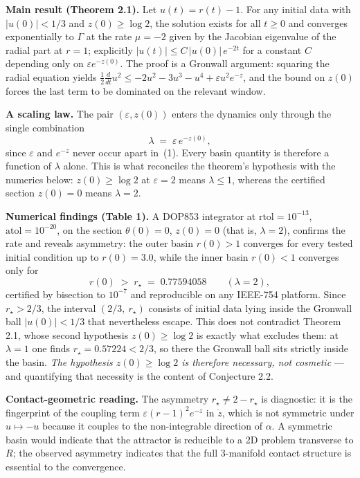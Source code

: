 \documentclass[11pt,a4paper]{article}
\theoremstyle{plain}
\newcommand{\rstar}{r_{\star}}
\begin{document}
\medskip
\noindent\textbf{Main result (Theorem 2.1).} Let $u(t) = r(t)-1$. For any initial data with
$|u(0)| < 1/3$ and $z(0) \ge \log 2$, the solution exists for all $t \ge 0$ and converges
exponentially to $\Gamma$ at the rate $\mu = -2$ given by the Jacobian eigenvalue of the radial part
at $r=1$; explicitly $|u(t)| \le C\,|u(0)|\,e^{-2t}$ for a constant $C$ depending only on
$\varepsilon e^{-z(0)}$. The proof is a Gronwall argument: squaring the radial equation yields
$\tfrac12 \tfrac{d}{dt}u^2 \le -2u^2 - 3u^3 - u^4 + \varepsilon u^2 e^{-z}$, and the bound on $z(0)$
forces the last term to be dominated on the relevant window.

\medskip
\noindent\textbf{A scaling law.} The pair $(\varepsilon, z(0))$ enters the dynamics only through the
single combination
\begin{equation}
  \lambda \;=\; \varepsilon\, e^{-z(0)},
\end{equation}
since $\varepsilon$ and $e^{-z}$ never occur apart in~(1). Every basin quantity is therefore a
function of $\lambda$ alone. This is what reconciles the theorem's hypothesis with the numerics
below: $z(0) \ge \log 2$ at $\varepsilon = 2$ means $\lambda \le 1$, whereas the certified section
$z(0)=0$ means $\lambda = 2$.

\medskip
\noindent\textbf{Numerical findings (Table 1).} A DOP853 integrator at
$\mathrm{rtol} = 10^{-13}$, $\mathrm{atol} = 10^{-20}$, on the section
$\theta(0)=0$, $z(0)=0$ (that is, $\lambda = 2$), confirms the rate and reveals
asymmetry: the outer basin $r(0)>1$ converges for every tested initial condition up to
$r(0) = 3.0$, while the inner basin $r(0)<1$ converges only for
\begin{equation}
  r(0) \;>\; \rstar \;=\; 0.77594058 \qquad (\lambda = 2),
\end{equation}
certified by bisection to $10^{-7}$ and reproducible on any IEEE-754 platform. Since
$\rstar > 2/3$, the interval $(2/3,\ \rstar)$ consists of initial data lying inside the Gronwall ball
$|u(0)|<1/3$ that nevertheless escape. This does not contradict Theorem 2.1, whose second hypothesis
$z(0)\ge\log 2$ is exactly what excludes them: at $\lambda = 1$ one finds
$\rstar = 0.57224 < 2/3$, so there the Gronwall ball sits strictly inside the basin. \emph{The
hypothesis $z(0)\ge\log 2$ is therefore necessary, not cosmetic} — and quantifying that necessity is
the content of Conjecture 2.2.

\medskip
\noindent\textbf{Contact-geometric reading.} The asymmetry $\rstar \ne 2-\rstar$ is diagnostic: it is
the fingerprint of the coupling term $\varepsilon(r-1)^2e^{-z}$ in $\dot z$, which is not symmetric
under $u \mapsto -u$ because it couples to the non-integrable direction of $\alpha$. A symmetric
basin would indicate that the attractor is reducible to a 2D problem transverse to $R$; the observed
asymmetry indicates that the full 3-manifold contact structure is essential to the convergence.
\end{document}
